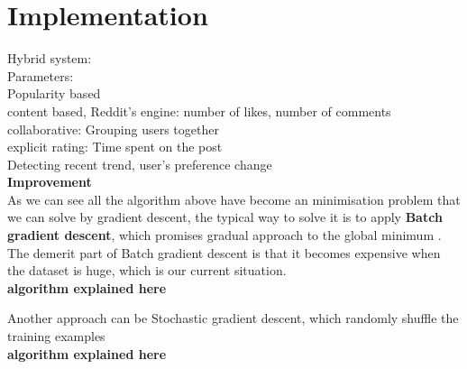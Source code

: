 \section{Implementation}
Hybrid system:
\\Parameters: 
\\Popularity based
\\content based, Reddit's engine:  number of likes, number of comments
\\collaborative: Grouping users together
\\explicit rating: Time spent on the post
\\Detecting recent trend, user's preference change
\\ \textbf{Improvement}
\\ As we can see all the algorithm above have become an minimisation problem that we can solve by gradient descent, the typical way to solve it is to apply \textbf{Batch gradient descent}, which promises gradual approach to the global minimum . The demerit part of Batch gradient descent is that it becomes expensive when the dataset is huge, which is our current situation.
\\ \textbf{algorithm explained here}

Another approach can be {Stochastic gradient descent}, which randomly shuffle the training examples 
\\ \textbf{algorithm explained here}





